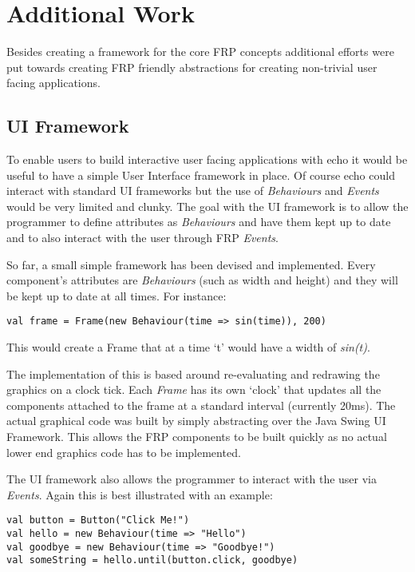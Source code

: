 \chapter{Additional Work}
  Besides creating a framework for the core FRP concepts additional efforts
  were put towards creating FRP friendly abstractions for creating non-trivial user facing
  applications.
  
  \section{UI Framework}
    To enable users to build interactive user facing applications with echo it would be useful to have a simple User 
    Interface framework in place. Of course echo could interact with standard UI frameworks but the use of \emph{Behaviours} 
    and \emph{Events} would be very limited and clunky. The goal with the UI framework is to allow the programmer to define 
    attributes as \emph{Behaviours} and have them kept up to date and to also interact with the user through FRP 
    \emph{Events}. 

    So far, a small simple framework has been devised and implemented. Every component's attributes are \emph{Behaviours} 
    (such as width and height) and they will be kept up to date at all times. For instance:

\begin{verbatim}
val frame = Frame(new Behaviour(time => sin(time)), 200) 
\end{verbatim}

    This would create a Frame that at a time `t' would have a width of \emph{sin(t)}.

    The implementation of this is based around re-evaluating and redrawing the graphics on a clock tick. Each 
    \emph{Frame} has its own `clock' that updates all the components attached to the frame at a standard interval (currently 
    20ms). The actual graphical code was built by simply abstracting over the Java Swing UI Framework. This allows the FRP 
    components to be built quickly as no actual lower end graphics code has to be implemented.

    The UI framework also allows the programmer to interact with the user via \emph{Events}. Again this is best illustrated 
    with an example:

\begin{verbatim}
val button = Button("Click Me!") 
val hello = new Behaviour(time => "Hello")
val goodbye = new Behaviour(time => "Goodbye!")
val someString = hello.until(button.click, goodbye) 
\end{verbatim}


